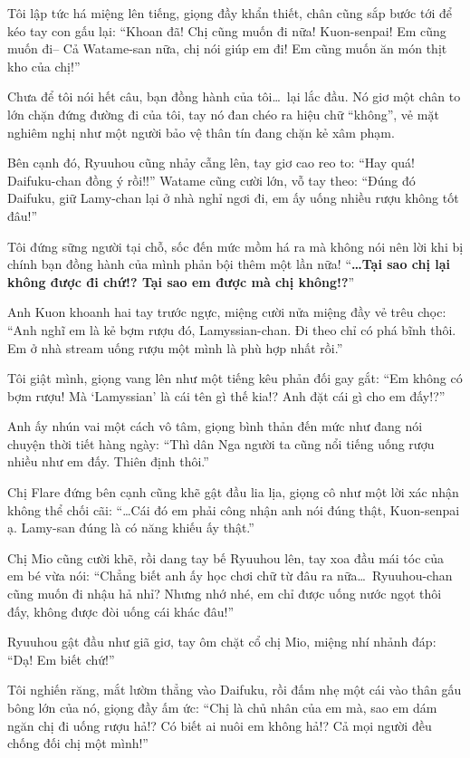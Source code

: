 \documentclass[../main.tex]{subfiles}
\begin{document}
Tôi lập tức há miệng lên tiếng, giọng đầy khẩn thiết, chân cũng sắp bước tới để kéo tay con gấu lại: ``Khoan đã! Chị cũng muốn đi nữa! Kuon-senpai! Em cũng muốn đi-- Cả Watame-san nữa, chị nói giúp em đi! Em cũng muốn ăn món thịt kho của chị!''

Chưa để tôi nói hết câu, bạn đồng hành của tôi\dots\ lại lắc đầu. Nó giơ một chân to lớn chặn đứng đường đi của tôi, tay nó đan chéo ra hiệu chữ ``không'', vẻ mặt nghiêm nghị như một người bảo vệ thân tín đang chặn kẻ xâm phạm.

Bên cạnh đó, Ryuuhou cũng nhảy cẫng lên, tay giơ cao reo to: ``Hay quá! Daifuku-chan đồng ý rồi!!'' Watame cũng cười lớn, vỗ tay theo: ``Đúng đó Daifuku, giữ Lamy-chan lại ở nhà nghỉ ngơi đi, em ấy uống nhiều rượu không tốt đâu!''

Tôi đứng sững người tại chỗ, sốc đến mức mồm há ra mà không nói nên lời khi bị chính bạn đồng hành của mình phản bội thêm một lần nữa! ``\textbf{\dots Tại sao chị lại không được đi chứ!? Tại sao em được mà chị không!?}''

Anh Kuon khoanh hai tay trước ngực, miệng cười nửa miệng đầy vẻ trêu chọc: ``Anh nghĩ em là kẻ bợm rượu đó, Lamyssian-chan. Đi theo chỉ có phá bĩnh thôi. Em ở nhà stream uống rượu một mình là phù hợp nhất rồi.''

Tôi giật mình, giọng vang lên như một tiếng kêu phản đối gay gắt: ``Em không có bợm rượu! Mà `Lamyssian' là cái tên gì thế kia!? Anh đặt cái gì cho em đấy!?''

Anh ấy nhún vai một cách vô tâm, giọng bình thản đến mức như đang nói chuyện thời tiết hàng ngày: ``Thì dân Nga người ta cũng nổi tiếng uống rượu nhiều như em đấy. Thiên định thôi.''

Chị Flare đứng bên cạnh cũng khẽ gật đầu lia lịa, giọng cô như một lời xác nhận không thể chối cãi: ``\dots Cái đó em phải công nhận anh nói đúng thật, Kuon-senpai ạ. Lamy-san đúng là có năng khiếu ấy thật.''

Chị Mio cũng cười khẽ, rồi dang tay bế Ryuuhou lên, tay xoa đầu mái tóc của em bé vừa nói: ``Chẳng biết anh ấy học chơi chữ từ đâu ra nữa\dots\ Ryuuhou-chan cũng muốn đi nhậu hả nhỉ? Nhưng nhớ nhé, em chỉ được uống nước ngọt thôi đấy, không được đòi uống cái khác đâu!''

Ryuuhou gật đầu như giã giơ, tay ôm chặt cổ chị Mio, miệng nhí nhảnh đáp: ``Dạ! Em biết chứ!''

Tôi nghiến răng, mắt lườm thẳng vào Daifuku, rồi đấm nhẹ một cái vào thân gấu bông lớn của nó, giọng đầy ấm ức: ``Chị là chủ nhân của em mà, sao em dám ngăn chị đi uống rượu hả!? Có biết ai nuôi em không hả!? Cả mọi người đều chống đối chị một mình!''
\end{document}
